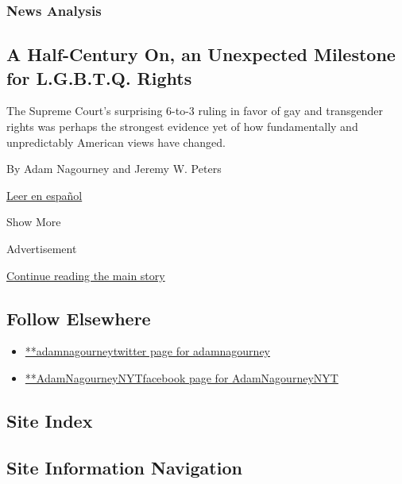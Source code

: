 \begin{enumerate}
  \hypertarget{news-analysis-1}{%
  \subsubsection{News Analysis}\label{news-analysis-1}}

  \hypertarget{a-half-century-on-an-unexpected-milestone-for-lgbtq-rights}{%
  \subsection{A Half-Century On, an Unexpected Milestone for L.G.B.T.Q.
  Rights}\label{a-half-century-on-an-unexpected-milestone-for-lgbtq-rights}}

  The Supreme Court's surprising 6-to-3 ruling in favor of gay and
  transgender rights was perhaps the strongest evidence yet of how
  fundamentally and unpredictably American views have changed.

  By Adam Nagourney and Jeremy W. Peters

  \href{https://www.nytimes3xbfgragh.onion/es/2020/06/17/espanol/derechos-lgbtq-corte-suprema.html}{Leer
  en español}
\end{enumerate}

Show More

Advertisement

\protect\hyperlink{after-mid2}{Continue reading the main story}

\hypertarget{follow-elsewhere}{%
\subsection{Follow Elsewhere}\label{follow-elsewhere}}

\begin{itemize}
\tightlist
\item
  \href{https://twitter.com/adamnagourney}{**adamnagourneytwitter page
  for adamnagourney}
\item
  \href{https://www.facebookcorewwwi.onion/AdamNagourneyNYT}{**AdamNagourneyNYTfacebook
  page for AdamNagourneyNYT}
\end{itemize}

\hypertarget{site-index}{%
\subsection{Site Index}\label{site-index}}

\hypertarget{site-information-navigation}{%
\subsection{Site Information
Navigation}\label{site-information-navigation}}

